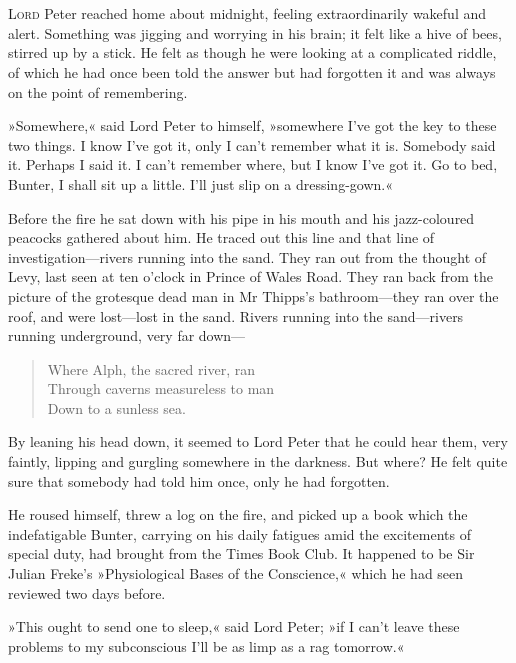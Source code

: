 \chapter[Chapter \thechapter]{}
\lettrine[lines=4]{L}{ord} Peter reached home about midnight, feeling extraordinarily wakeful and alert. Something was jigging and worrying in his brain; it felt like a hive of bees, stirred up by a stick. He felt as though he were looking at a complicated riddle, of which he had once been told the answer but had forgotten it and was always on the point of remembering.

»Somewhere,« said Lord Peter to himself, »somewhere I've got the key to these two things. I know I've got it, only I can't remember what it is. Somebody said it. Perhaps I said it. I can't remember where, but I know I've got it. Go to bed, Bunter, I shall sit up a little. I'll just slip on a dressing-gown.«

Before the fire he sat down with his pipe in his mouth and his jazz-coloured peacocks gathered about him. He traced out this line and that line of investigation—rivers running into the sand. They ran out from the thought of Levy, last seen at ten o'clock in Prince of Wales Road. They ran back from the picture of the grotesque dead man in Mr Thipps's bathroom—they ran over the roof, and were lost—lost in the sand. Rivers running into the sand—rivers running underground, very far down—

\begin{verse}
Where Alph, the sacred river, ran\\
Through caverns measureless to man\\
Down to a sunless sea.\\
\end{verse}


By leaning his head down, it seemed to Lord Peter that he could hear them, very faintly, lipping and gurgling somewhere in the darkness. But where? He felt quite sure that somebody had told him once, only he had forgotten.

He roused himself, threw a log on the fire, and picked up a book which the indefatigable Bunter, carrying on his daily fatigues amid the excitements of special duty, had brought from the Times Book Club. It happened to be Sir Julian Freke's »Physiological Bases of the Conscience,« which he had seen reviewed two days before.

»This ought to send one to sleep,« said Lord Peter; »if I can't leave these problems to my subconscious I'll be as limp as a rag tomorrow.«

